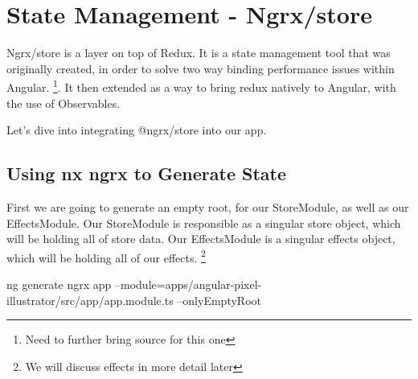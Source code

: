 \maketitle{}
\section{ State Management - Ngrx/store }

Ngrx/store is a layer on top of Redux. It is a state management tool that was
originally created, in order to solve two way binding performance issues within
Angular. \footnote{Need to further bring source for this one}. It then extended
as a way to bring redux natively to Angular, with the use of Observables.

Let's dive into integrating @ngrx/store into our app. 

\subsection{ Using nx ngrx to Generate State }

First we are going to generate an empty root, for our StoreModule, as well as
our EffectsModule. Our StoreModule is responsible as a singular store object,
which will be holding all of store data. Our EffectsModule is a singular effects
object, which will be holding all of our effects. \footnote{We will discuss
effects in more detail later}

ng generate ngrx app --module=apps/angular-pixel-illustrator/src/app/app.module.ts --onlyEmptyRoot
